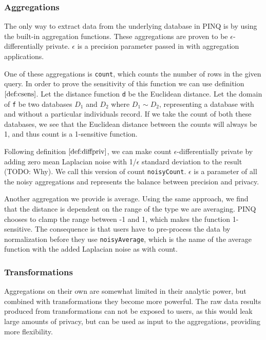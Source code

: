 \documentclass[12pt]{article}
\begin{document}
\subsubsection{Aggregations}

The only way to extract data from the underlying database in PINQ is by using the built-in aggregation functions.
These aggregations are proven to be $\epsilon$-differentially private.
$\epsilon$ is a precision parameter passed in with aggregation applications.

One of these aggregations is \texttt{count}, which counts the number of rows in the given query.
In order to prove the sensitivity of this function we can use definition $\ref{def:csens}$.
Let the distance function \texttt{d} be the Euclidean distance.
Let the domain of \texttt{f} be two databases $D_1$ and $D_2$ where $D_1 \sim D_2$, representing a database with and without a particular individuals record.
If we take the count of both these databases, we see that the Euclidean distance between the counts will always be 1, and thus count is a 1-sensitive function.

Following definition $\ref{def:diffpriv}$, we can make count $\epsilon$-differentially private by adding zero mean Laplacian noise with 1/$\epsilon$ standard deviation to the result (TODO: Why).
We call this version of count \texttt{noisyCount}.
$\epsilon$ is a parameter of all the noisy aggregations and represents the balance between precision and privacy.

Another aggregation we provide is average.
Using the same approach, we find that the distance is dependent on the range of the type we are averaging.
PINQ chooses to clamp the range between -1 and 1, which makes the function 1-sensitive.
The consequence is that users have to pre-process the data by normalization before they use \texttt{noisyAverage}, which is the name of the average function with the added Laplacian noise as with count.

\subsubsection{Transformations}

Aggregations on their own are somewhat limited in their analytic power, but combined with transformations they become more powerful.
The raw data results produced from transformations can not be exposed to users, as this would leak large amounts of privacy, but can be used as input to the aggregations, providing more flexibility.
\end{document}
